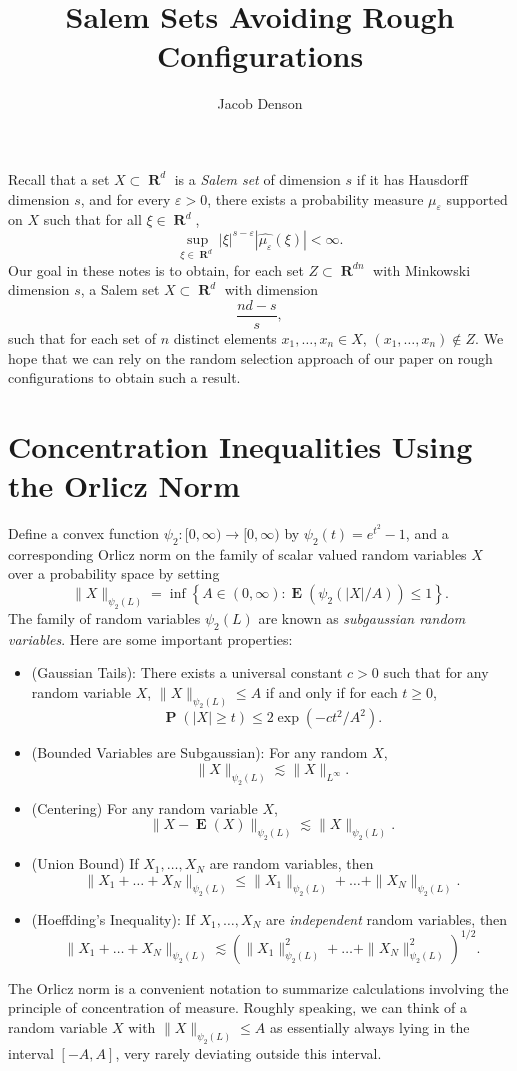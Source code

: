 \documentclass[12pt,reqno]{amsart}
\title{Salem Sets Avoiding Rough Configurations}
\author{Jacob Denson}
\DeclareMathOperator{\RR}{\mathbf{R}}
\DeclareMathOperator{\EE}{\mathbf{E}}
\DeclareMathOperator{\PP}{\mathbf{P}}
\newcommand{\psitwo}[1]{\| {#1} \|_{\psi_2(L)}}
\begin{document}
\maketitle

Recall that a set $X \subset \RR^d$ is a \emph{Salem set} of dimension $s$ if it has Hausdorff dimension $s$, and for every $\varepsilon > 0$, there exists a probability measure $\mu_\varepsilon$ supported on $X$ such that for all $\xi \in \RR^d$,
%
\[ \sup_{\xi \in \RR^d} |\xi|^{s - \varepsilon} |\widehat{\mu_\varepsilon}(\xi)| < \infty. \]
%
Our goal in these notes is to obtain, for each set $Z \subset \RR^{dn}$ with Minkowski dimension $s$, a Salem set $X \subset \RR^d$ with dimension
%
\[ \frac{nd - s}{s}, \]
%
such that for each set of $n$ distinct elements $x_1, \dots, x_n \in X$, $(x_1, \dots, x_n) \not \in Z$. We hope that we can rely on the random selection approach of our paper on rough configurations to obtain such a result.

\section{Concentration Inequalities Using the Orlicz Norm}

Define a convex function $\psi_2: [0,\infty) \to [0,\infty)$ by $\psi_2(t) = e^{t^2} - 1$, and a corresponding Orlicz norm on the family of scalar valued random variables $X$ over a probability space by setting
%
\[ \psitwo{X} = \inf \left\{ A \in (0,\infty) : \EE(\psi_2(|X|/A)) \leq 1 \right\}. \]
%
The family of random variables $\psi_2(L)$ are known as \emph{subgaussian random variables}. Here are some important properties:
%
\begin{itemize}
	\item (Gaussian Tails): There exists a universal constant $c > 0$ such that for any random variable $X$, $\psitwo{X} \leq A$ if and only if for each $t \geq 0$,
	\[ \PP \left( |X| \geq t \right) \leq 2 \exp \left( -ct^2/A^2 \right). \]

	\item (Bounded Variables are Subgaussian): For any random $X$,
	\[ \psitwo{X} \lesssim \| X \|_{L^\infty}. \]

	\item (Centering) For any random variable $X$,
	\[ \psitwo{X - \EE(X)} \lesssim \psitwo{X}. \]
	
	\item (Union Bound) If $X_1, \dots, X_N$ are random variables, then
	\[ \psitwo{X_1 + \dots + X_N} \leq \psitwo{X_1} + \dots + \psitwo{X_N}. \]
	
	\item (Hoeffding's Inequality): If $X_1, \dots, X_N$ are \emph{independent} random variables, then
	\[ \psitwo{X_1 + \dots + X_N} \lesssim \left( \psitwo{X_1}^2 + \dots + \psitwo{X_N}^2 \right)^{1/2}. \]
\end{itemize}
%
The Orlicz norm is a convenient notation to summarize calculations involving the principle of concentration of measure. Roughly speaking, we can think of a random variable $X$ with $\psitwo{X} \leq A$ as essentially always lying in the interval $[-A,A]$, very rarely deviating outside this interval.
\end{document}
